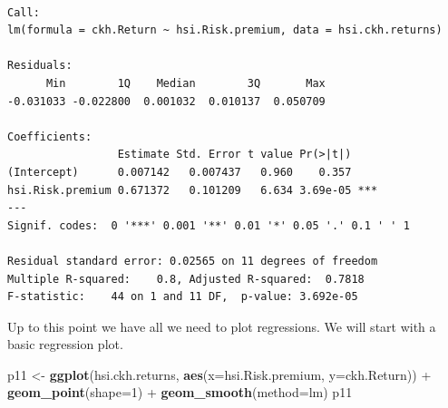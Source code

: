 \documentclass[]{article}
\newenvironment{Shaded}{\begin{snugshade}}{\end{snugshade}}
\newcommand{\KeywordTok}[1]{\textcolor[rgb]{0.13,0.29,0.53}{\textbf{{#1}}}}
\newcommand{\DataTypeTok}[1]{\textcolor[rgb]{0.13,0.29,0.53}{{#1}}}
\newcommand{\DecValTok}[1]{\textcolor[rgb]{0.00,0.00,0.81}{{#1}}}
\newcommand{\StringTok}[1]{\textcolor[rgb]{0.31,0.60,0.02}{{#1}}}
\newcommand{\NormalTok}[1]{{#1}}
\begin{document}
\begin{Shaded}
\end{Shaded}

\begin{verbatim}

Call:
lm(formula = ckh.Return ~ hsi.Risk.premium, data = hsi.ckh.returns)

Residuals:
      Min        1Q    Median        3Q       Max 
-0.031033 -0.022800  0.001032  0.010137  0.050709 

Coefficients:
                 Estimate Std. Error t value Pr(>|t|)    
(Intercept)      0.007142   0.007437   0.960    0.357    
hsi.Risk.premium 0.671372   0.101209   6.634 3.69e-05 ***
---
Signif. codes:  0 '***' 0.001 '**' 0.01 '*' 0.05 '.' 0.1 ' ' 1

Residual standard error: 0.02565 on 11 degrees of freedom
Multiple R-squared:    0.8, Adjusted R-squared:  0.7818 
F-statistic:    44 on 1 and 11 DF,  p-value: 3.692e-05
\end{verbatim}

Up to this point we have all we need to plot regressions. We will start
with a basic regression plot.

\begin{Shaded}
\begin{Highlighting}[]
\NormalTok{p11 <-}\StringTok{ }\KeywordTok{ggplot}\NormalTok{(hsi.ckh.returns, }\KeywordTok{aes}\NormalTok{(}\DataTypeTok{x=}\NormalTok{hsi.Risk.premium, }\DataTypeTok{y=}\NormalTok{ckh.Return)) +}\StringTok{ }\KeywordTok{geom_point}\NormalTok{(}\DataTypeTok{shape=}\DecValTok{1}\NormalTok{) +}\StringTok{ }\KeywordTok{geom_smooth}\NormalTok{(}\DataTypeTok{method=}\NormalTok{lm) }
\NormalTok{p11}
\end{Highlighting}
\end{Shaded}
\end{document}
